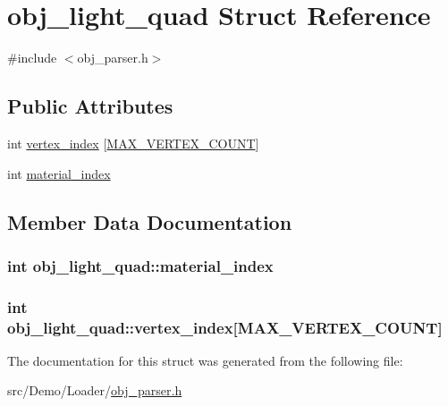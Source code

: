 \hypertarget{structobj__light__quad}{\section{obj\+\_\+light\+\_\+quad Struct Reference}
\label{structobj__light__quad}
}


{\ttfamily \#include $<$obj\+\_\+parser.\+h$>$}

\subsection*{Public Attributes}
\begin{DoxyCompactItemize}
\item 
int \hyperlink{structobj__light__quad_a1ed9f7f7a517ab90f2b8c6b515f3654e}{vertex\+\_\+index} \mbox{[}\hyperlink{obj__parser_8h_acbf8be5cb832d11ce1584c3024d2a569}{M\+A\+X\+\_\+\+V\+E\+R\+T\+E\+X\+\_\+\+C\+O\+U\+N\+T}\mbox{]}
\item 
int \hyperlink{structobj__light__quad_ad12afb43f3ca35ebd6c6e3a81063edb2}{material\+\_\+index}
\end{DoxyCompactItemize}


\subsection{Member Data Documentation}
\hypertarget{structobj__light__quad_ad12afb43f3ca35ebd6c6e3a81063edb2}{
\subsubsection[{material\+\_\+index}]{\setlength{\rightskip}{0pt plus 5cm}int obj\+\_\+light\+\_\+quad\+::material\+\_\+index}}\label{structobj__light__quad_ad12afb43f3ca35ebd6c6e3a81063edb2}
\hypertarget{structobj__light__quad_a1ed9f7f7a517ab90f2b8c6b515f3654e}{
\subsubsection[{vertex\+\_\+index}]{\setlength{\rightskip}{0pt plus 5cm}int obj\+\_\+light\+\_\+quad\+::vertex\+\_\+index\mbox{[}{\bf M\+A\+X\+\_\+\+V\+E\+R\+T\+E\+X\+\_\+\+C\+O\+U\+N\+T}\mbox{]}}}\label{structobj__light__quad_a1ed9f7f7a517ab90f2b8c6b515f3654e}


The documentation for this struct was generated from the following file\+:\begin{DoxyCompactItemize}
\item 
src/\+Demo/\+Loader/\hyperlink{obj__parser_8h}{obj\+\_\+parser.\+h}\end{DoxyCompactItemize}
